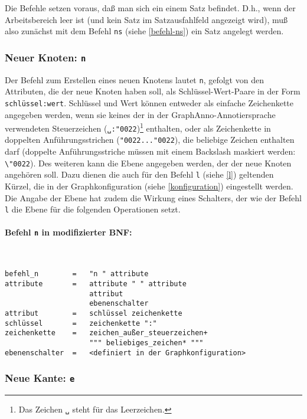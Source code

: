 \documentclass[12pt]{scrartcl}
\newcommand{\quo}{\char"0022}
\begin{document}
Die Befehle setzen voraus, daß man sich ein einem Satz befindet. D.h., wenn der Arbeitsbereich leer ist (und kein Satz im Satzausfahlfeld angezeigt wird), muß also zunächst mit dem Befehl \texttt{ns} (siehe \ref{befehl-ns}) ein Satz angelegt werden.


\subsubsection{Neuer Knoten: \texttt{n}}\label{befehl-n}

Der Befehl zum Erstellen eines neuen Knotens lautet \texttt{n}, gefolgt von den Attributen, die der neue Knoten haben soll, als Schlüssel-Wert-Paare in der Form \texttt{schlüssel:wert}. Schlüssel und Wert können entweder als einfache Zeichenkette angegeben werden, wenn sie keines der in der GraphAnno-Annotiersprache verwendeten Steuerzeichen (\texttt{␣:\quo})\footnote{Das Zeichen \texttt{␣} steht für das Leerzeichen.} enthalten, oder als Zeichenkette in doppelten Anführungsstrichen (\texttt{\quo...\quo}), die beliebige Zeichen enthalten darf (doppelte Anführungsstriche müssen mit einem Backslash maskiert werden: \texttt{\textbackslash\quo}).
Des weiteren kann die Ebene angegeben werden, der der neue Knoten angehören soll. Dazu dienen die auch für den Befehl \texttt{l} (siehe \ref{l}) geltenden Kürzel, die in der Graphkonfiguration (siehe \ref{konfiguration}) eingestellt werden. Die Angabe der Ebene hat zudem die Wirkung eines Schalters, der wie der Befehl \texttt{l} die Ebene für die folgenden Operationen setzt.

\paragraph*{Befehl \texttt{n} in modifizierter BNF:}
~
\begin{framed}
\begin{lstlisting}
befehl_n        =   "n " attribute
attribute       =   attribute " " attribute
                    attribut
                    ebenenschalter
attribut        =   schlüssel zeichenkette
schlüssel       =   zeichenkette ":"
zeichenkette    =   zeichen_außer_steuerzeichen+
                    """ beliebiges_zeichen* """
ebenenschalter  =   <definiert in der Graphkonfiguration>
\end{lstlisting}
\end{framed}


\subsubsection{Neue Kante: \texttt{e}}
\end{document}
